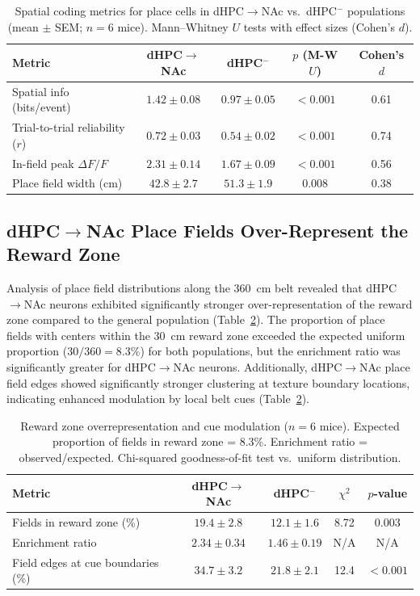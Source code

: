 \documentclass[11pt]{article}
\begin{document}
\begin{table}[htbp]
\centering
\caption{Spatial coding metrics for place cells in dHPC$\to$NAc vs.\ dHPC$^{-}$ populations (mean $\pm$ SEM; $n = 6$ mice). Mann--Whitney $U$ tests with effect sizes (Cohen's $d$).}
\label{tab:spatial}
\begin{tabular}{lcccc}
\toprule
\textbf{Metric} & \textbf{dHPC$\to$NAc} & \textbf{dHPC$^{-}$} & \textbf{$p$ (M-W $U$)} & \textbf{Cohen's $d$} \\
\midrule
Spatial info (bits/event) & $1.42 \pm 0.08$ & $0.97 \pm 0.05$ & $<0.001$ & 0.61 \\
Trial-to-trial reliability ($r$) & $0.72 \pm 0.03$ & $0.54 \pm 0.02$ & $<0.001$ & 0.74 \\
In-field peak $\Delta F/F$ & $2.31 \pm 0.14$ & $1.67 \pm 0.09$ & $<0.001$ & 0.56 \\
Place field width (cm) & $42.8 \pm 2.7$ & $51.3 \pm 1.9$ & $0.008$ & 0.38 \\
\bottomrule
\end{tabular}
\end{table}

\subsection{dHPC$\to$NAc Place Fields Over-Represent the Reward Zone}

Analysis of place field distributions along the 360~cm belt revealed that dHPC$\to$NAc neurons exhibited significantly stronger over-representation of the reward zone compared to the general population (Table~\ref{tab:rewardzone}). The proportion of place fields with centers within the 30~cm reward zone exceeded the expected uniform proportion ($30/360 = 8.3\%$) for both populations, but the enrichment ratio was significantly greater for dHPC$\to$NAc neurons. Additionally, dHPC$\to$NAc place field edges showed significantly stronger clustering at texture boundary locations, indicating enhanced modulation by local belt cues (Table~\ref{tab:rewardzone}).

\begin{table}[htbp]
\centering
\caption{Reward zone overrepresentation and cue modulation ($n = 6$ mice). Expected proportion of fields in reward zone = 8.3\%. Enrichment ratio = observed/expected. Chi-squared goodness-of-fit test vs.\ uniform distribution.}
\label{tab:rewardzone}
\begin{tabular}{lcccc}
\toprule
\textbf{Metric} & \textbf{dHPC$\to$NAc} & \textbf{dHPC$^{-}$} & \textbf{$\chi^2$} & \textbf{$p$-value} \\
\midrule
Fields in reward zone (\%) & $19.4 \pm 2.8$ & $12.1 \pm 1.6$ & 8.72 & $0.003$ \\
Enrichment ratio & $2.34 \pm 0.34$ & $1.46 \pm 0.19$ & N/A & N/A \\
Field edges at cue boundaries (\%) & $34.7 \pm 3.2$ & $21.8 \pm 2.1$ & 12.4 & $<0.001$ \\
\bottomrule
\end{tabular}
\end{table}
\end{document}

